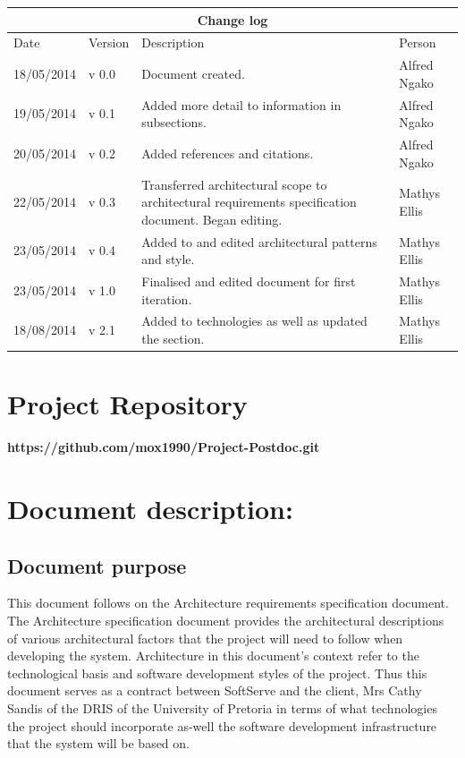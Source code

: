 \documentclass[12pt]{article}
\newcommand{\repo}{https://github.com/mox1990/Project-Postdoc.git}
\begin{document}
\begin{center}
\begin{tabular}{|l|p{1.4cm}|p{8cm}|p{2.8cm}|}
\hline
\multicolumn{4}{|c|}{\bf Change log} \\
\hline
 Date & Version & Description &  Person \\
\hline
18/05/2014 & v 0.0 & Document created. & Alfred Ngako \\
\hline
19/05/2014 & v 0.1 & Added more detail to information in subsections. & Alfred Ngako \\
\hline
20/05/2014 & v 0.2 & Added references and citations. & Alfred Ngako \\
\hline
22/05/2014 & v 0.3 & Transferred architectural scope to architectural requirements specification document. Began editing. & Mathys Ellis \\
\hline
23/05/2014 & v 0.4 & Added to and edited architectural patterns and style. & Mathys Ellis \\
\hline
23/05/2014 & v 1.0 & Finalised and edited document for first iteration. & Mathys Ellis \\
\hline
18/08/2014 & v 2.1 & Added to technologies as well as updated the section. & Mathys Ellis \\
\hline
\end{tabular}
\end{center}
\newpage
\tableofcontents

\listoffigures
\newpage
\section{Project Repository}
\textbf{\repo}
\newpage

\section{Document description:}%

\subsection{Document purpose}
\vspace{0.2in}

This document follows on the Architecture requirements specification document. The Architecture specification document provides the architectural descriptions of various architectural factors that the project will need to follow when developing the system.  Architecture in this document's context refer to the technological basis and software development styles of the project. Thus this document serves as a contract between SoftServe and the client, Mrs Cathy Sandis of the DRIS of the University of Pretoria in terms of what technologies the project should incorporate as-well the software development infrastructure that the system will be based on.
\vspace{0.2in}
\end{document}
